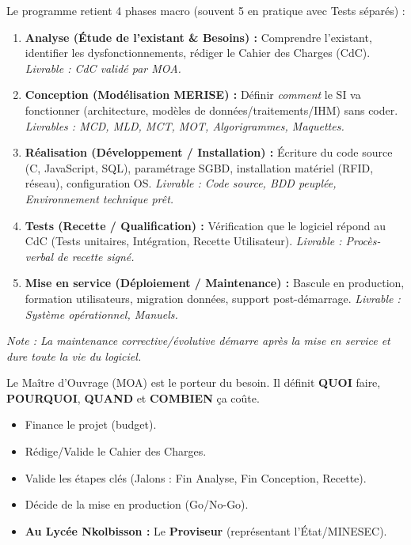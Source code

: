 \documentclass[11pt]{article}
\newcommand{\cle}[1]{{\popxbold\color{popdark}#1}}
\begin{document}
\begin{propriete}
Le programme retient 4 phases macro (souvent 5 en pratique avec Tests séparés) :
\begin{enumerate}
    \item \textbf{Analyse (Étude de l'existant \& Besoins) :} Comprendre l'existant, identifier les dysfonctionnements, rédiger le \cle{Cahier des Charges (CdC)}. \emph{Livrable : CdC validé par MOA.}
    \item \textbf{Conception (Modélisation MERISE) :} Définir \emph{comment} le SI va fonctionner (architecture, modèles de données/traitements/IHM) sans coder. \emph{Livrables : MCD, MLD, MCT, MOT, Algorigrammes, Maquettes.}
    \item \textbf{Réalisation (Développement / Installation) :} Écriture du code source (C, JavaScript, SQL), paramétrage SGBD, installation matériel (RFID, réseau), configuration OS. \emph{Livrable : Code source, BDD peuplée, Environnement technique prêt.}
    \item \textbf{Tests (Recette / Qualification) :} Vérification que le logiciel répond au CdC (Tests unitaires, Intégration, Recette Utilisateur). \emph{Livrable : Procès-verbal de recette signé.}
    \item \textbf{Mise en service (Déploiement / Maintenance) :} Bascule en production, formation utilisateurs, migration données, support post-démarrage. \emph{Livrable : Système opérationnel, Manuels.}
\end{enumerate}
\textit{Note : La maintenance corrective/évolutive démarre après la mise en service et dure toute la vie du logiciel.}
\end{propriete}

\begin{definition}
Le \cle{Maître d'Ouvrage (MOA)} est le porteur du besoin. Il définit \textbf{QUOI} faire, \textbf{POURQUOI}, \textbf{QUAND} et \textbf{COMBIEN} ça coûte.
\begin{itemize}
    \item Finance le projet (budget).
    \item Rédige/Valide le Cahier des Charges.
    \item Valide les étapes clés (Jalons : Fin Analyse, Fin Conception, Recette).
    \item Décide de la mise en production (Go/No-Go).
    \item \textbf{Au Lycée Nkolbisson :} Le \textbf{Proviseur} (représentant l'État/MINESEC).
\end{itemize}
\end{definition}
\end{document}
